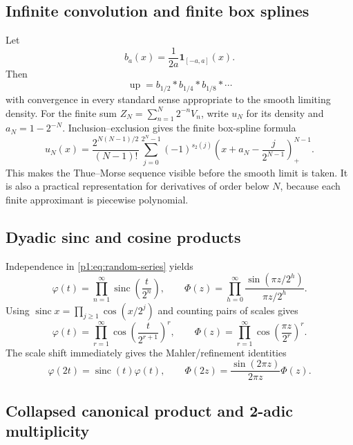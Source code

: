 \documentclass[11pt,oneside]{article}
\theoremstyle{definition}
\newcommand{\Up}{\operatorname{up}}
\newcommand{\sinc}{\operatorname{sinc}}
\newcommand{\wt}{s_2}
\newcommand{\PhiF}{\Phi}
\newcommand{\phiF}{\varphi}
\begin{document}
\subsection{Infinite convolution and finite box splines}

Let
\[
 b_a(x)=\frac1{2a}\mathbf 1_{[-a,a]}(x).
\]
Then
\begin{equation}
 \Up=b_{1/2}*b_{1/4}*b_{1/8}*\cdots
 \label{p1:eq:infinite-convolution}
\end{equation}
with convergence in every standard sense appropriate to the smooth limiting density.
For the finite sum \(Z_N=\sum_{n=1}^N2^{-n}V_n\), write \(u_N\) for its density and
\(a_N=1-2^{-N}\).  Inclusion--exclusion gives the finite box-spline formula
\begin{equation}
 u_N(x)=\frac{2^{N(N-1)/2}}{(N-1)!}
 \sum_{j=0}^{2^N-1}(-1)^{\wt(j)}
 \left(x+a_N-\frac{j}{2^{N-1}}\right)_+^{N-1}.
 \label{p1:eq:finite-box-spline}
\end{equation}
This makes the Thue--Morse sequence visible before the smooth limit is taken.  It is
also a practical representation for derivatives of order below \(N\), because each
finite approximant is piecewise polynomial.

\subsection{Dyadic sinc and cosine products}

Independence in \eqref{p1:eq:random-series} yields
\begin{equation}
 \boxed{\quad
 \phiF(t)=\prod_{n=1}^{\infty}\sinc\!\left(\frac{t}{2^n}\right),
 \qquad
 \PhiF(z)=\prod_{h=0}^{\infty}
 \frac{\sin(\pi z/2^h)}{\pi z/2^h}.
 \quad}
 \label{p1:eq:sinc-products}
\end{equation}
Using \(\sinc x=\prod_{j\ge1}\cos(x/2^j)\) and counting pairs of scales gives
\begin{equation}
 \phiF(t)=\prod_{r=1}^{\infty}
 \cos\!\left(\frac{t}{2^{r+1}}\right)^r,
 \qquad
 \PhiF(z)=\prod_{r=1}^{\infty}
 \cos\!\left(\frac{\pi z}{2^r}\right)^r.
 \label{p1:eq:cosine-products}
\end{equation}
The scale shift immediately gives the Mahler/refinement identities
\begin{equation}
 \phiF(2t)=\sinc(t)\phiF(t),
 \qquad
 \PhiF(2z)=\frac{\sin(2\pi z)}{2\pi z}\PhiF(z).
 \label{p1:eq:phi-scaling}
\end{equation}

\subsection{Collapsed canonical product and 2-adic multiplicity}
\end{document}
